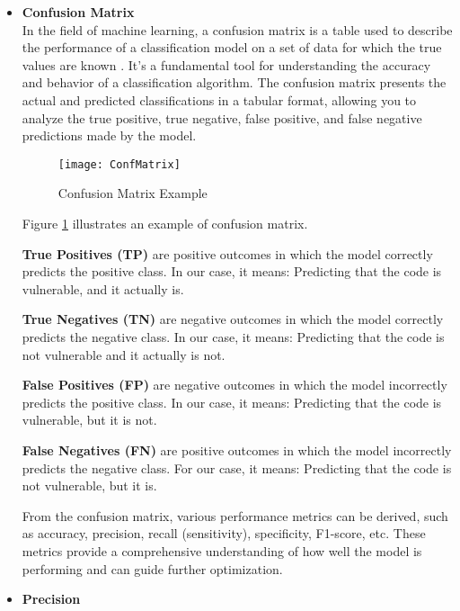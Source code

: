 \begin{itemize}
\item \textbf{ Confusion Matrix} \\

In the field of machine learning, a confusion matrix is a table used to describe the performance of a classification model on a set of data for which the true values are known \cite{Somogyi2021}. It's a fundamental tool for understanding the accuracy and behavior of a classification algorithm. The confusion matrix presents the actual and predicted classifications in a tabular format, allowing you to analyze the true positive, true negative, false positive, and false negative predictions made by the model.

\newpage

\begin{figure}[ht]
	\centering
	\texttt{[image: ConfMatrix]}
	  \caption{Confusion Matrix Example}
  \label{fig:ConfMatrix}
\end{figure}

Figure \ref{fig:ConfMatrix} illustrates an example of confusion matrix.

\textbf{True Positives (TP)} are positive outcomes in which the model correctly predicts the positive class. In our case, it means: Predicting that the code is vulnerable, and it actually is.

\textbf{True Negatives (TN)} are negative outcomes in which the model correctly predicts the negative class. In our case, it means: Predicting that the code is not vulnerable and it actually is not.

\textbf{False Positives (FP)} are negative outcomes in which the model incorrectly predicts the positive class. In our case, it means: Predicting that the code is vulnerable, but it is not.

\textbf{False Negatives (FN)} are positive outcomes in which the model incorrectly predicts the negative class. For our case, it means: Predicting that the code is not vulnerable, but it is.

From the confusion matrix, various performance metrics can be derived, such as accuracy, precision, recall (sensitivity), specificity, F1-score, etc. These metrics provide a comprehensive understanding of how well the model is performing and can guide further optimization.

\newpage

\item \textbf{Precision}


\end{itemize}
